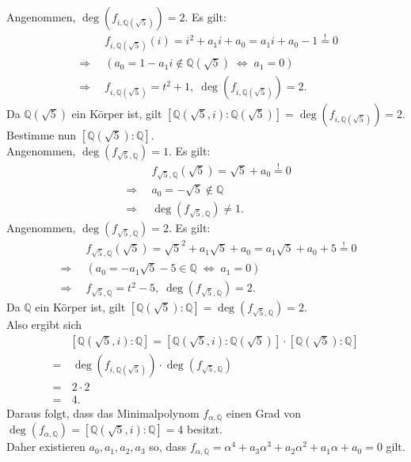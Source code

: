 \documentclass[12pt]{article}
\newcommand{\df}{\enspace\Longrightarrow\enspace}
\newcommand{\gdw}{\;\Longleftrightarrow\;}
\newcommand{\grad}{\operatorname{deg}}
\begin{document}
\begin{enumerate}
	Angenommen, $\grad(f_{i,\mathbb{Q}(\sqrt{5})})=2$. Es gilt:
	\begin{align*}
		&f_{i,\mathbb{Q}(\sqrt{5})}(i)=i^2+a_1i+a_0=a_1i+a_0-1\overset{!}{=}0 \\
		\df&\left(a_0=1-a_1i\notin\mathbb{Q}(\sqrt{5})\gdw a_1=0\right) \\
		\df&f_{i,\mathbb{Q}(\sqrt{5})}=t^2+1,\;\grad(f_{i,\mathbb{Q}(\sqrt{5})})=2.
	\end{align*}
	Da $\mathbb{Q}(\sqrt{5})$ ein Körper ist, gilt $\left[\mathbb{Q}(\sqrt{5},i):\mathbb{Q}(\sqrt{5})\right]=\grad(f_{i,\mathbb{Q}(\sqrt{5})})=2$.
	Bestimme nun $\left[\mathbb{Q}(\sqrt{5}):\mathbb{Q}\right]$. \\
	Angenommen, $\grad(f_{\sqrt{5},\mathbb{Q}})=1$. Es gilt:
	\begin{align*}
		&f_{\sqrt{5},\mathbb{Q}}(\sqrt{5})=\sqrt{5}+a_0\overset{!}{=}0 \\
		\df&a_0=-\sqrt{5}\notin\mathbb{Q} \\
		\df&\grad(f_{\sqrt{5},\mathbb{Q}})\neq1.
	\end{align*}
	Angenommen, $\grad(f_{\sqrt{5},\mathbb{Q}})=2$. Es gilt:
	\begin{align*}
		&f_{\sqrt{5},\mathbb{Q}}(\sqrt{5})=\sqrt{5}^2+a_1\sqrt{5}+a_0=a_1\sqrt{5}+a_0+5\overset{!}{=}0 \\
		\df&\left(a_0=-a_1\sqrt{5}-5\in\mathbb{Q}\gdw a_1=0\right) \\
		\df&f_{\sqrt{5},\mathbb{Q}}=t^2-5,\;\grad(f_{\sqrt{5},\mathbb{Q}})=2.
	\end{align*}
	Da $\mathbb{Q}$ ein Körper ist, gilt $\left[\mathbb{Q}(\sqrt{5}):\mathbb{Q}\right]=\grad(f_{\sqrt{5},\mathbb{Q}})=2$. \\
	Also ergibt sich 
	\begin{align*}
		&\left[\mathbb{Q}(\sqrt{5},i):\mathbb{Q}\right]=\left[\mathbb{Q}(\sqrt{5},i):\mathbb{Q}(\sqrt{5})\right]\cdot\left[\mathbb{Q}(\sqrt{5}):\mathbb{Q}\right] \\
		=&\,\grad(f_{i,\mathbb{Q}(\sqrt{5})})\cdot\grad(f_{\sqrt{5},\mathbb{Q}}) \\
		=&\,2\cdot2 \\
		=&\,4.
	\end{align*}
	Daraus folgt, dass das Minimalpolynom $f_{\alpha,\mathbb{Q}}$ einen Grad von $\grad(f_{\alpha,\mathbb{Q}})=\left[\mathbb{Q}(\sqrt{5},i):\mathbb{Q}\right]=4$ besitzt. \\
	Daher existieren $a_0,a_1,a_2,a_3$ so, dass $f_{\alpha,\mathbb{Q}}=\alpha^4+a_3\alpha^3+a_2\alpha^2+a_1\alpha+a_0=0$ gilt.

\end{enumerate}
\end{document}
